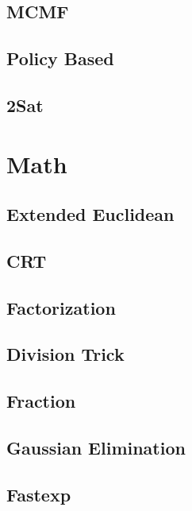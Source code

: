 \subsection{MCMF}
\raggedbottom
\hrulefill
\subsection{Policy Based}
\raggedbottom
\hrulefill
\subsection{2Sat}
\raggedbottom
\hrulefill

\section{Math}
\subsection{Extended Euclidean}
\raggedbottom
\hrulefill
\subsection{CRT}
\raggedbottom
\hrulefill
\subsection{Factorization}
\raggedbottom
\hrulefill
\subsection{Division Trick}
\raggedbottom
\hrulefill
\subsection{Fraction}
\raggedbottom
\hrulefill
\subsection{Gaussian Elimination}
\raggedbottom
\hrulefill
\subsection{Fastexp}
\raggedbottom
\hrulefill
